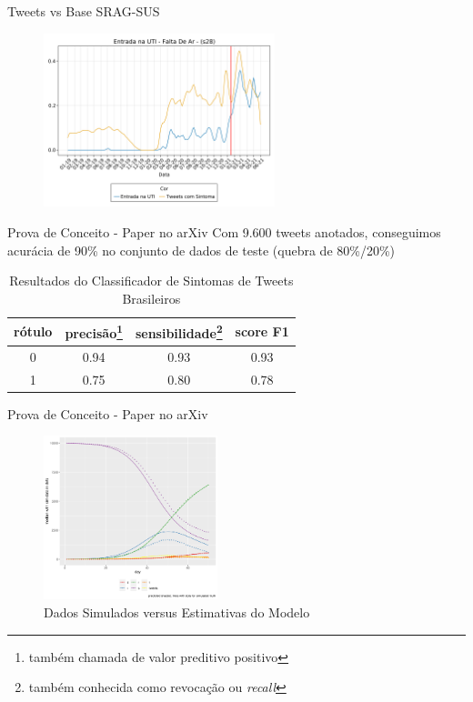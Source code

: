 \documentclass[aspectratio=169]{beamer}                    %
\begin{document}
\begin{frame}{Tweets vs Base SRAG-SUS}
    \begin{figure}
        \centering
        \includegraphics[width=0.6\textwidth]{srag_twitter_s28_ent.png}
        \label{fig:srag_twitter_s28_ent}
    \end{figure}
\end{frame}

\begin{frame}{Prova de Conceito - Paper no arXiv \parencite{storopoliSimulationDrivenCOVID19Epidemiological2021a}}
    Com 9.600 tweets anotados, conseguimos acurácia de 90\% no conjunto de dados de teste (quebra de 80\%/20\%)
    \vfill
    \begin{table}
        \centering
        \begin{tabular}{|c | c c c|}
            \hline
            rótulo & precisão\footnote{também chamada de valor preditivo positivo} & sensibilidade\footnote{também conhecida como revocação ou \textit{recall}} & score F1 \\
            \hline
            0 & 0.94 & 0.93 & 0.93 \\
            1 & 0.75 & 0.80 & 0.78 \\
            \hline
        \end{tabular}
        \label{tab:result_arXiv_classifier}
        \caption{Resultados do Classificador de Sintomas de Tweets Brasileiros}
    \end{table}
\end{frame}

\begin{frame}{Prova de Conceito - Paper no arXiv \parencite{storopoliSimulationDrivenCOVID19Epidemiological2021a}}
    \begin{figure}
        \centering
        \includegraphics[width=0.45\textwidth]{fit_simulated.png}
        \caption{Dados Simulados versus Estimativas do Modelo}
        \label{fig:fit_simulated}
    \end{figure}
\end{frame}
\end{document}
